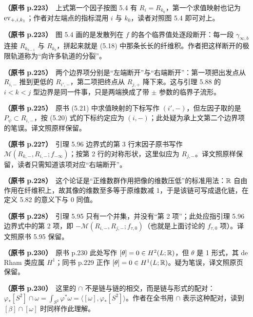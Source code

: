 \noindent \textbf{（原书 p.223）}\ 上式第一个因子按图 5.4 有 $R_i=R_{k_0}$，第一个求值映射也记为 $\operatorname{ev}_{+,i,k_1}$；作者对左端点的指标混用 $i$ 与 $k_0$，读者对照图 5.4 即可对上。\par\smallskip

\noindent \textbf{（原书 p.223）}\ 图 5.4 画的是发散列在 $f$ 的各个临界值处逐段断开：每一段 $\gamma_{\infty,b}$ 连接 $R_{k_{b-1}}$ 与 $R_{k_b}$，拼起来就是 (5.18) 中那条长长的纤维积。作者把这样断开的极限轨道称为“向许多轨道的分裂”。\par\smallskip

\noindent \textbf{（原书 p.225）}\ 两个边界项分别是“左端断开”与“右端断开”：第一项把出发点从 $R_{i,-}$ 推到更低的 $R_{i',-}$，第二项把终点从 $R_{j,+}$ 降下来。这与引理 5.88 的 $i<k<j$ 型边界是同一件事，只是两端换成了带 $\pm$ 参数的临界子流形。\par\smallskip

\noindent \textbf{（原书 p.225）}\ 原书 (5.21) 中求值映射的下标写作 $(i',-)$，但左因子取的是 $P_\psi\subset R_{i,-}$，按 (5.20) 式的下标约定应为 $(i,-)$；此处疑为承上文第二个边界项的笔误。译文照原样保留。\par\smallskip

\noindent \textbf{（原书 p.227）}\ 引理 5.96 边界式的第 3 行末因子原书写作 $\mathcal{M}(R_{k,-},R_{i,-};f_{-\infty})$；按第 2 行的对称形状，这里似应为 $R_{j,-}$。译文照原样保留，读者只需知道该项对应“右端断开”。\par\smallskip

\noindent \textbf{（原书 p.228）}\ 这个论证是“正维数群作用把像的维数压低”的标准用法：$\mathbb{R}$ 自由作用在纤维积上，故其像的维数至多等于原维数减 1，于是该链可写成退化链，在定义 5.82 的意义下与 0 同值。\par\smallskip

\noindent \textbf{（原书 p.228）}\ 引理 5.95 只有一个并集，并没有“第 2 项”；此处应指引理 5.96 边界式中的第 2 项，即 $-\mathcal{M}(R_{i,-},R_{j,-};f_{\tau,0})$（也就是上面讨论的 $f_{\tau,0}$ 项）。译文照原书 5.95 保留。\par\smallskip

\noindent \textbf{（原书 p.230）}\ 原书 p.230 此处写作 $[\theta]=0\in H^2(L;\mathbb{R})$，但 $\theta$ 是 1 形式，其 de Rham 类应属 $H^1$；同书 p.229 正作 $[\theta]=0\in H^1(L;\mathbb{R})$。疑为笔误，译文照原页保留。\par\smallskip

\noindent \textbf{（原书 p.230）}\ 这里的 $\cap$ 不是链与链的相交，而是链与形式的配对：$\varphi_*[S^2]\cap\omega=\int_{S^2}\varphi^*\omega=\langle[\omega],\varphi_*[S^2]\rangle$。作者在全书用 $\cap$ 表示这种配对，读到 $[\beta]\cap[\omega]$ 时同样作此理解。\par\smallskip

